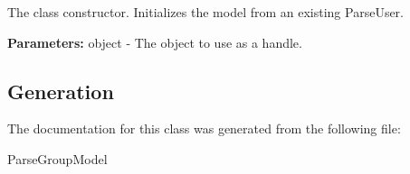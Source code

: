 The class constructor. Initializes the model from an existing ParseUser.

\textbf{Parameters:}
\tab    object - The object to use as a handle.


\subsection{Generation}
The documentation for this class was generated from the following file\-:
\begin{DoxyCompactItemize}
\item ParseGroupModel
\end{DoxyCompactItemize} 









